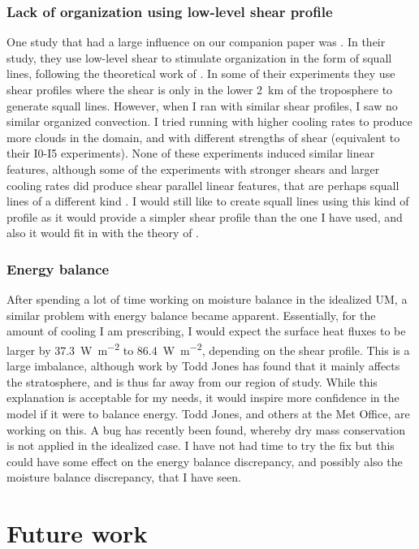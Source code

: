 \documentclass[11pt,a4paper]{article}
\begin{document}
\subsubsection{Lack of organization using low-level shear profile}
One study that had a large influence on our companion paper was \cite{RE2001}. In their study, they use low-level shear to stimulate organization in the form of squall lines, following the theoretical work of \cite{RKW1988}. In some of their experiments they use shear profiles where the shear is only in the lower \SI{2}{km} of the troposphere to generate squall lines. However, when I ran with similar shear profiles, I saw no similar organized convection. I tried running with higher cooling rates to produce more clouds in the domain, and with different strengths of shear (equivalent to their I0-I5 experiments). None of these experiments induced similar linear features, although some of the experiments with stronger shears and larger cooling rates did produce shear parallel linear features, that are perhaps squall lines of a different kind \parencite{parker2007simulated}. I would still like to create squall lines using this kind of profile as it would provide a simpler shear profile than the one I have used, and also it would fit in with the theory of \cite{RKW1988}.

\subsubsection{Energy balance}
After spending a lot of time working on moisture balance in the idealized UM, a similar problem with energy balance became apparent. Essentially, for the amount of cooling I am prescribing, I would expect the surface heat fluxes to be larger by \SI{37.3}{W.m^{-2}} to \SI{86.4}{W.m^{-2}}, depending on the shear profile. This is a large imbalance, although work by Todd Jones has found that it mainly affects the stratosphere, and is thus far away from our region of study. While this explanation is acceptable for my needs, it would inspire more confidence in the model if it were to balance energy. Todd Jones, and others at the Met Office, are working on this. A bug has recently been found, whereby dry mass conservation is not applied in the idealized case. I have not had time to try the fix but this could have some effect on the energy balance discrepancy, and possibly also the moisture balance discrepancy, that I have seen.

\section{Future work}
\end{document}
